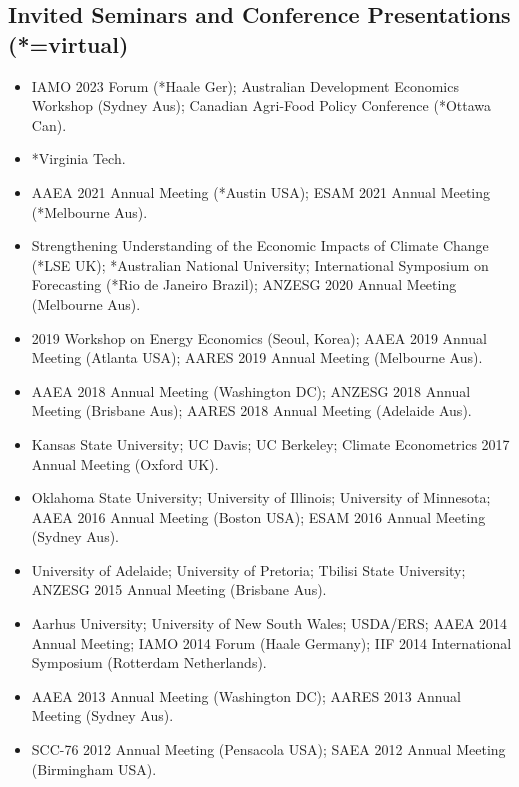\documentclass[10pt]{article}
\begin{document}
	\subsection*{Invited Seminars and Conference Presentations (*=virtual)}
	\begin{itemize}
		\item {} IAMO 2023 Forum (*Haale Ger); Australian Development Economics Workshop (Sydney Aus); Canadian Agri-Food Policy Conference (*Ottawa Can).
		\item {} *Virginia Tech.
		\item {} AAEA 2021 Annual Meeting (*Austin USA); ESAM 2021 Annual Meeting (*Melbourne Aus).
		\item {} Strengthening Understanding of the Economic Impacts of Climate Change (*LSE UK); *Australian National University; International Symposium on Forecasting (*Rio de Janeiro Brazil); ANZESG 2020 Annual Meeting (Melbourne Aus).
		\item {} 2019 Workshop on Energy Economics (Seoul, Korea); AAEA 2019 Annual Meeting (Atlanta USA); AARES 2019 Annual Meeting (Melbourne Aus).
		\item {} AAEA 2018 Annual Meeting (Washington DC); ANZESG 2018 Annual Meeting (Brisbane Aus); AARES 2018 Annual Meeting (Adelaide Aus).
		\item {} Kansas State University; UC Davis; UC Berkeley; Climate Econometrics 2017 Annual Meeting (Oxford UK).
		\item {} Oklahoma State University; University of Illinois; University of Minnesota; AAEA 2016 Annual Meeting (Boston USA); ESAM 2016 Annual Meeting (Sydney Aus).
		\item {} University of Adelaide; University of Pretoria; Tbilisi State University; ANZESG 2015 Annual Meeting (Brisbane Aus).
		\item {} Aarhus University; University of New South Wales; USDA/ERS; AAEA 2014 Annual Meeting; IAMO 2014 Forum (Haale Germany); IIF 2014 International Symposium (Rotterdam Netherlands).
		\item {} AAEA 2013 Annual Meeting (Washington DC); AARES 2013 Annual Meeting (Sydney Aus).
		\item {} SCC-76 2012 Annual Meeting (Pensacola USA); SAEA 2012 Annual Meeting (Birmingham USA).
	\end{itemize}
	
	\bigskip
	
\end{document}
